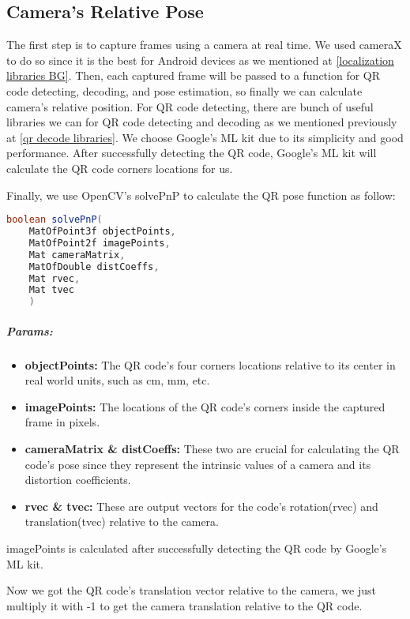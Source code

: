 \subsection{Camera's Relative Pose}
The first step is to capture frames using a camera at real time. We used cameraX to do so since it is the best for Android devices as we mentioned at \ref{localization libraries BG}. Then, each captured frame will be passed to a function for QR code detecting, decoding, and pose estimation, so finally we can calculate camera's relative position. For QR code detecting, there are bunch of useful libraries we can for QR code detecting and decoding as we mentioned previously at \ref{qr decode libraries}. We choose Google's ML kit due to its simplicity and good performance. After successfully detecting the QR code, Google's ML kit will calculate the QR code corners locations for us.

Finally, we use OpenCV's solvePnP to calculate the QR pose function as follow:

\begin{lstlisting}[language=Java]
	boolean solvePnP(
	MatOfPoint3f objectPoints, 
	MatOfPoint2f imagePoints, 
	Mat cameraMatrix, 
	MatOfDouble distCoeffs, 
	Mat rvec, 
	Mat tvec
	)
\end{lstlisting}

\subparagraph{Params:}

\begin{itemize}
	\item \textbf{objectPoints:}
	The QR code's four corners locations relative to its center in real world units, such as cm, mm, etc.
	\item \textbf{imagePoints:}
	The locations of the QR code's corners inside the captured frame in pixels.
	
	\item \textbf{cameraMatrix \& distCoeffs:}
	These two are crucial for calculating the QR code's pose since they represent the intrinsic values of a camera and its distortion coefficients.
	
	\item \textbf{rvec \& tvec:}
	These are output vectors for the code's rotation(rvec) and translation(tvec) relative to the camera.
\end{itemize}
imagePoints is calculated after successfully detecting the QR code by Google's ML kit.

Now we got the QR code's translation vector relative to the camera, we just multiply it with -1 to get the camera translation relative to the QR code.